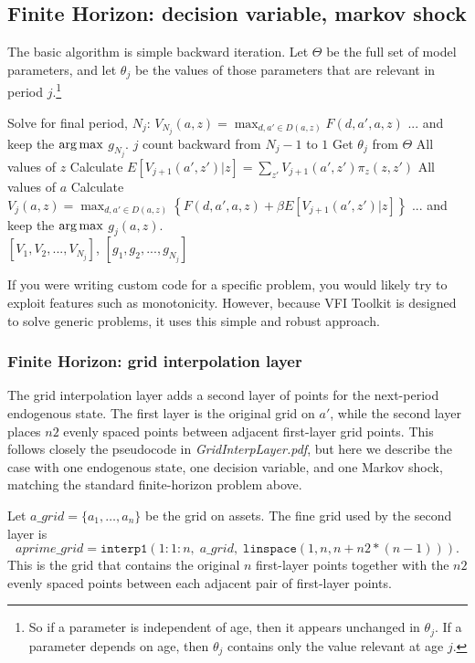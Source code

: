 \subsection{Finite Horizon: decision variable, markov shock}
The basic algorithm is simple backward iteration. Let $\Theta$ be the full set of model parameters, and let $\theta_j$ be the values of those parameters that are relevant in period $j$.\footnote{So if a parameter is independent of age, then it appears unchanged in $\theta_j$. If a parameter depends on age, then $\theta_j$ contains only the value relevant at age $j$.}
\begin{algorithmic}
 \State Solve for final period, $N_j$: $V_{N_j}(a,z)=\max_{d,a' \in D(a,z)} F(d,a',a,z) $
 \State ... and keep the $\operatorname*{arg\,max}$ $g_{N_j}$.
 \For $j$ count backward from $N_j-1$ to $1$
   \State Get $\theta_j$ from $\Theta$
   \For All values of $z$
    \State Calculate $E[V_{j+1}(a',z')|z]=\sum_{z'} V_{j+1}(a',z') \pi_z(z,z')$
    \For All values of $a$
     \State Calculate $V_j(a,z)=\max_{d,a' \in D(a,z)} \left\{ F(d,a',a,z)+\beta E[V_{j+1}(a',z')|z] \right\}$
     \State ... and keep the $\operatorname*{arg\,max}$ $g_j(a,z)$.
     \EndFor
   \EndFor
  \EndFor
   \\ \Return $[V_1,V_2,...,V_{N_j}]$, $[g_1,g_2,...,g_{N_j}]$
\end{algorithmic}

If you were writing custom code for a specific problem, you would likely try to exploit features such as monotonicity. However, because VFI Toolkit is designed to solve generic problems, it uses this simple and robust approach.

\subsubsection{Finite Horizon: grid interpolation layer}
The grid interpolation layer adds a second layer of points for the next-period endogenous state. The first layer is the original grid on $a'$, while the second layer places $n2$ evenly spaced points between adjacent first-layer grid points. This follows closely the pseudocode in \textit{GridInterpLayer.pdf}, but here we describe the case with one endogenous state, one decision variable, and one Markov shock, matching the standard finite-horizon problem above.

Let $a\_{}grid=\{a_1,\dots,a_n\}$ be the grid on assets. The fine grid used by the second layer is
\[
aprime\_{}grid=\texttt{interp1}(1\!:\!1\!:\!n,\;a\_{}grid,\;\texttt{linspace}(1,n,n+n2*(n-1))).
\]
This is the grid that contains the original $n$ first-layer points together with the $n2$ evenly spaced points between each adjacent pair of first-layer points.

